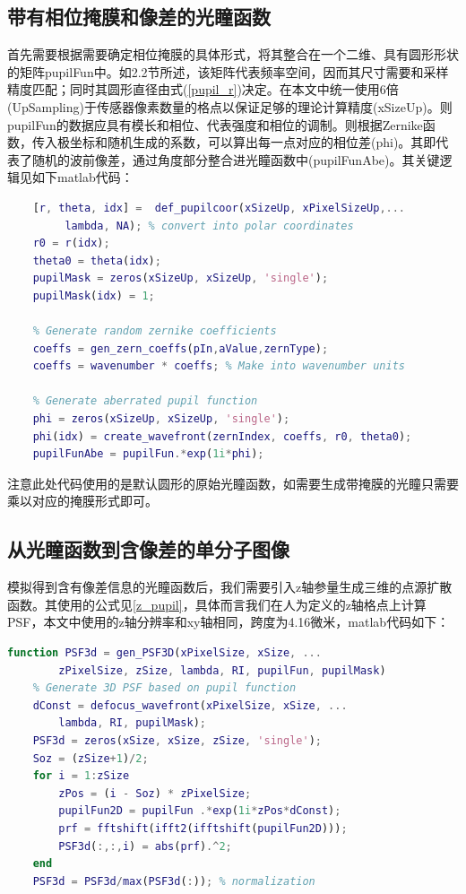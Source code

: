 \documentclass[draft=false,oneside]{fduthesis}
\begin{document}
    \subsection*{带有相位掩膜和像差的光瞳函数}
    首先需要根据需要确定相位掩膜的具体形式，将其整合在一个二维、具有圆形形状的矩阵pupilFun中。如2.2节所述，该矩阵代表频率空间，因而其尺寸需要和采样精度匹配；同时其圆形直径由式(\ref{pupil_r})决定。在本文中统一使用6倍(UpSampling)于传感器像素数量的格点以保证足够的理论计算精度(xSizeUp)。则pupilFun的数据应具有模长和相位、代表强度和相位的调制。则根据Zernike函数，传入极坐标和随机生成的系数，可以算出每一点对应的相位差(phi)。其即代表了随机的波前像差，通过角度部分整合进光瞳函数中(pupilFunAbe)。其关键逻辑见如下matlab代码：

    \begin{lstlisting}[language=Matlab]
    % Generate the original pupil function
    [r, theta, idx] =  def_pupilcoor(xSizeUp, xPixelSizeUp,...
         lambda, NA); % convert into polar coordinates
    r0 = r(idx); 
    theta0 = theta(idx);
    pupilMask = zeros(xSizeUp, xSizeUp, 'single');
    pupilMask(idx) = 1;

    % Generate random zernike coefficients
    coeffs = gen_zern_coeffs(pIn,aValue,zernType);
    coeffs = wavenumber * coeffs; % Make into wavenumber units

    % Generate aberrated pupil function
    phi = zeros(xSizeUp, xSizeUp, 'single');
    phi(idx) = create_wavefront(zernIndex, coeffs, r0, theta0); 
    pupilFunAbe = pupilFun.*exp(1i*phi);
    \end{lstlisting}
    
    注意此处代码使用的是默认圆形的原始光瞳函数，如需要生成带掩膜的光瞳只需要乘以对应的掩膜形式即可。

    \subsection*{从光瞳函数到含像差的单分子图像}
    模拟得到含有像差信息的光瞳函数后，我们需要引入z轴参量生成三维的点源扩散函数。其使用的公式见\ref{z_pupil}，具体而言我们在人为定义的z轴格点上计算PSF，本文中使用的z轴分辨率和xy轴相同，跨度为4.16微米，matlab代码如下：

    \begin{lstlisting}[language=Matlab]
    function PSF3d = gen_PSF3D(xPixelSize, xSize, ...
        zPixelSize, zSize, lambda, RI, pupilFun, pupilMask)
    % Generate 3D PSF based on pupil function
    dConst = defocus_wavefront(xPixelSize, xSize, ...
        lambda, RI, pupilMask); 
    PSF3d = zeros(xSize, xSize, zSize, 'single');
    Soz = (zSize+1)/2; 
    for i = 1:zSize
        zPos = (i - Soz) * zPixelSize;
        pupilFun2D = pupilFun .*exp(1i*zPos*dConst);
        prf = fftshift(ifft2(ifftshift(pupilFun2D)));
        PSF3d(:,:,i) = abs(prf).^2;
    end
    PSF3d = PSF3d/max(PSF3d(:)); % normalization
    \end{lstlisting}
    
\end{document}
